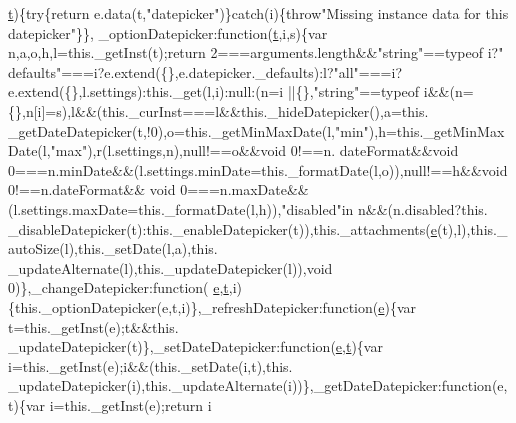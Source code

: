 \begin{DoxyCode}
      \hyperlink{jquery-2_80_83_8min_8js_aaccc9105df5383111407fd5b41255e23}{t})\{\textcolor{keywordflow}{try}\{\textcolor{keywordflow}{return} e.data(t,\textcolor{stringliteral}{"datepicker"})\}\textcolor{keywordflow}{catch}(i)\{\textcolor{keywordflow}{throw}\textcolor{stringliteral}{"Missing instance data for this datepicker"}\}\},
      \_optionDatepicker:\textcolor{keyword}{function}(\hyperlink{jquery-2_80_83_8min_8js_aaccc9105df5383111407fd5b41255e23}{t},i,s)\{var n,a,o,h,l=this.\_getInst(t);\textcolor{keywordflow}{return} 2===arguments.length&&\textcolor{stringliteral}{"string"}==typeof i?\textcolor{stringliteral}{"
      defaults"}===i?e.extend(\{\},e.datepicker.\_defaults):l?\textcolor{stringliteral}{"all"}===i?e.extend(\{\},l.settings):this.\_get(l,i):null:(n=i
      ||\{\},\textcolor{stringliteral}{"string"}==typeof i&&(n=\{\},n[i]=s),l&&(this.\_curInst===l&&this.\_hideDatepicker(),a=this.
      \_getDateDatepicker(t,!0),o=this.\_getMinMaxDate(l,\textcolor{stringliteral}{"min"}),h=this.\_getMinMaxDate(l,\textcolor{stringliteral}{"max"}),r(l.settings,n),null!==o&&\textcolor{keywordtype}{void} 0!==n.
      dateFormat&&\textcolor{keywordtype}{void} 0===n.minDate&&(l.settings.minDate=this.\_formatDate(l,o)),null!==h&&\textcolor{keywordtype}{void} 0!==n.dateFormat&&\textcolor{keywordtype}{
      void} 0===n.maxDate&&(l.settings.maxDate=\textcolor{keyword}{this}.\_formatDate(l,h)),\textcolor{stringliteral}{"disabled"}in n&&(n.disabled?\textcolor{keyword}{this}.
      \_disableDatepicker(t):this.\_enableDatepicker(t)),this.\_attachments(\hyperlink{jquery-ui_8min_8js_a2c038346d47955cbe2cb91e338edd7e1}{e}(t),l),this.\_autoSize(l),this.\_setDate(l,a),this.
      \_updateAlternate(l),this.\_updateDatepicker(l)),\textcolor{keywordtype}{void} 0)\},\_changeDatepicker:\textcolor{keyword}{function}(
      \hyperlink{jquery-ui_8min_8js_a2c038346d47955cbe2cb91e338edd7e1}{e},\hyperlink{jquery-2_80_83_8min_8js_aaccc9105df5383111407fd5b41255e23}{t},i)\{this.\_optionDatepicker(e,t,i)\},\_refreshDatepicker:\textcolor{keyword}{function}(\hyperlink{jquery-ui_8min_8js_a2c038346d47955cbe2cb91e338edd7e1}{e})\{var t=this.\_getInst(e);t&&this.
      \_updateDatepicker(t)\},\_setDateDatepicker:\textcolor{keyword}{function}(\hyperlink{jquery-ui_8min_8js_a2c038346d47955cbe2cb91e338edd7e1}{e},\hyperlink{jquery-2_80_83_8min_8js_aaccc9105df5383111407fd5b41255e23}{t})\{var i=this.\_getInst(e);i&&(this.\_setDate(i,t),this.
      \_updateDatepicker(i),this.\_updateAlternate(i))\},\_getDateDatepicker:\textcolor{keyword}{function}(e,t)\{var i=this.\_getInst(e);\textcolor{keywordflow}{return} i

\end{DoxyCode}
